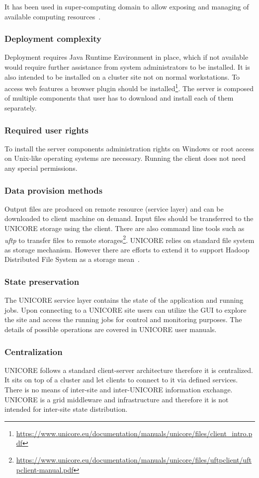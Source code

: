 It has been used in super-computing domain to allow exposing and managing of available 
computing resources~\cite{unicore_arch}.

\subsubsection {Deployment complexity}
Deployment requires Java Runtime Environment in place, which if not available would require 
further assistance from system administrators to be installed. It is also intended to be installed
on a cluster site not on normal workstations. To access web features a browser plugin should be
installed\footnote{\url{https://www.unicore.eu/documentation/manuals/unicore/files/client_intro.pdf}}.
The server is composed of multiple components that user 
has to download and install each of them separately.
\subsubsection {Required user rights}
To install the server components administration rights on Windows or root access on Unix-like operating
systems are necessary. Running the client does not need any special permissions.
\subsubsection{Data provision methods}
Output files are produced on remote resource (service layer) and can be downloaded to client
machine on demand. Input files should be transferred to the UNICORE storage using the client.
There are also command line tools such as \textit{uftp} to transfer files to remote 
storages\footnote{\url{https://www.unicore.eu/documentation/manuals/unicore/files/uftpclient/uftpclient-manual.pdf}}.
UNICORE relies on standard file system as storage mechanism. However there are efforts to 
extend it to support Hadoop Distributed File System as a storage mean~\cite{wasim2009}.
\subsubsection {State preservation}
The UNICORE service layer contains the state of the application and running jobs. 
Upon connecting to a UNICORE site users can utilize the GUI to explore 
the site and access the running jobs for control and monitoring purposes.
The details of possible operations are covered in UNICORE user manuals.

\subsubsection {Centralization}
UNICORE follows a standard client-server architecture therefore it is centralized. It sits on 
top of a cluster and let clients to connect to it via defined services. There is no means
of inter-site and inter-UNICORE information exchange. UNICORE is a grid middleware and
infrastructure and therefore it is not intended for inter-site state distribution.
